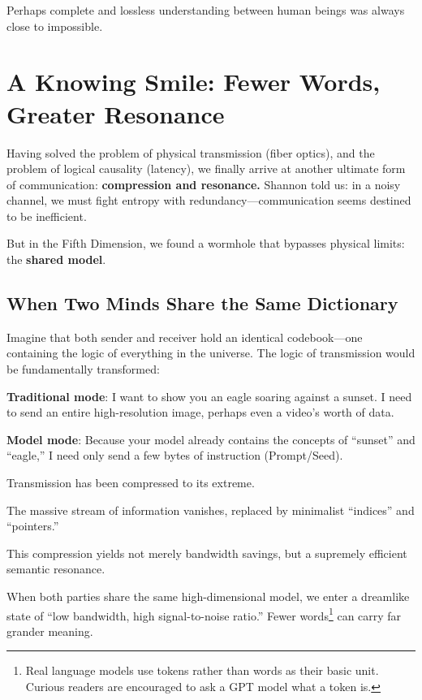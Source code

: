 \vspace{1em}

Perhaps complete and lossless understanding between human beings was always close to impossible.

\newpage
\section{A Knowing Smile: Fewer Words, Greater Resonance}

Having solved the problem of physical transmission (fiber optics), and the problem of logical causality (latency), we finally arrive at another ultimate form of communication: \textbf{compression and resonance.}
Shannon told us: in a noisy channel, we must fight entropy with redundancy---communication seems destined to be inefficient.

But in the Fifth Dimension, we found a wormhole that bypasses physical limits: the \textbf{shared model}.

\subsection{When Two Minds Share the Same Dictionary}

Imagine that both sender and receiver hold an identical codebook---one containing the logic of everything in the universe. The logic of transmission would be fundamentally transformed:

\textbf{Traditional mode}: I want to show you an eagle soaring against a sunset. I need to send an entire high-resolution image, perhaps even a video's worth of data.

\textbf{Model mode}: Because your model already contains the concepts of ``sunset'' and ``eagle,'' I need only send a few bytes of instruction (Prompt/Seed).

\vspace{1em}

Transmission has been compressed to its extreme.

The massive stream of information vanishes, replaced by minimalist ``indices'' and ``pointers.''

This compression yields not merely bandwidth savings, but a supremely efficient semantic resonance.

When both parties share the same high-dimensional model, we enter a dreamlike state of ``low bandwidth, high signal-to-noise ratio.''
Fewer words\footnote{Real language models use tokens rather than words as their basic unit. Curious readers are encouraged to ask a GPT model what a token is.} can carry far grander meaning.

